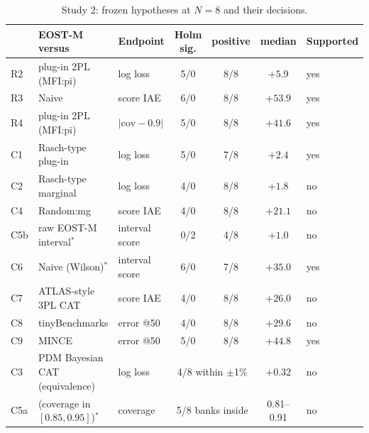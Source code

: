 \begin{table}[htbp]
\centering\footnotesize
\caption{Study 2: frozen hypotheses at $N=8$ and their decisions.}
\label{tab:study2}
\setlength{\tabcolsep}{3pt}
\begin{tabular}{@{}lllcccl@{}}
\toprule
 & EOST-M versus & Endpoint & Holm sig. & positive & median & Supported \\
\midrule
R2 & plug-in 2PL (MFI:pi) & log loss & 5/0 & 8/8 & $+5.9$ & yes \\
R3 & Naive & score IAE & 6/0 & 8/8 & $+53.9$ & yes \\
R4 & plug-in 2PL (MFI:pi) & $|\mathrm{cov}-0.9|$ & 5/0 & 8/8 & $+41.6$ & yes \\
C1 & Rasch-type plug-in & log loss & 5/0 & 7/8 & $+2.4$ & yes \\
C2 & Rasch-type marginal & log loss & 4/0 & 8/8 & $+1.8$ & no \\
C4 & Random:mg & score IAE & 4/0 & 8/8 & $+21.1$ & no \\
C5b & raw EOST-M interval$^\ast$ & interval score & 0/2 & 4/8 & $+1.0$ & no \\
C6 & Naive (Wilson)$^\ast$ & interval score & 6/0 & 7/8 & $+35.0$ & yes \\
C7 & ATLAS-style 3PL CAT & score IAE & 4/0 & 8/8 & $+26.0$ & no \\
C8 & tinyBenchmarks & error @50 & 4/0 & 8/8 & $+29.6$ & no \\
C9 & MINCE & error @50 & 5/0 & 8/8 & $+44.8$ & yes \\
\midrule
C3 & PDM Bayesian CAT (equivalence) & log loss & \multicolumn{2}{c}{4/8 within $\pm$1\%} & $+0.32$ & no \\
C5a & (coverage in $[0.85,0.95]$)$^\ast$ & coverage & \multicolumn{2}{c}{5/8 banks inside} & 0.81--0.91 & no \\
\bottomrule
\end{tabular}
\end{table}
